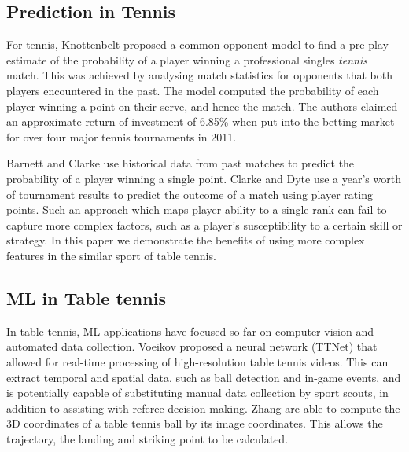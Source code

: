 \subsection{Prediction in Tennis}
For tennis, Knottenbelt \etal \cite{knottenbelt2012common} proposed a common opponent model to find a pre-play estimate of the probability of a player winning a professional singles \textit{tennis} match. This was achieved by analysing match statistics for opponents that both players encountered in the past.%
The model computed the probability of each player winning a point on their serve, and hence the match. The authors claimed an approximate return of investment of 6.85\% when put into the betting market for over four major tennis tournaments in 2011.  

Barnett and Clarke \cite{barnett2005combining} use historical data from past matches to predict the probability of a player winning a single point. Clarke and Dyte \cite{clarke2000using} use a year's worth of tournament results to predict the outcome of a match using player rating points. Such an approach which maps player ability to a single rank can fail to capture more complex factors, such as  a player's susceptibility to a certain skill or strategy. In this paper we demonstrate the benefits of using more complex features in the similar sport of table tennis.



\subsection{ML in Table tennis}
In table tennis, ML applications have focused so far on computer vision and automated data collection. %
Voeikov \etal \cite{voeikov2020ttnet} proposed a neural network (TTNet) that allowed for real-time processing of high-resolution table tennis videos. This can extract temporal and spatial data, such as ball detection and in-game events, and is potentially capable of substituting manual data collection by sport scouts, in addition to assisting with referee decision making. Zhang \etal \cite{zhang2010visual} are able to compute the 3D coordinates of a table tennis ball by its image coordinates. This allows the trajectory, the landing and striking point to be calculated.

